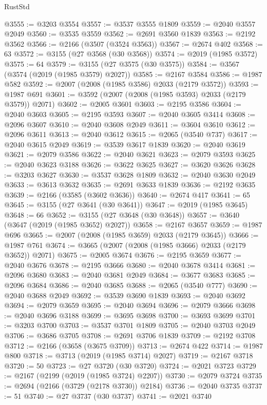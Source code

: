 \begin{lexlean}{RustStd}
\begin{coremodule}
@3555 := @3203 @3554
@3557 := @3537 @3555 @1809
@3559 := @2040 @3557 @2049
@3560 := @3535 @3559
@3562 := @2691 @3560 @1839
@3563 := @2192 @3562
@3566 := @2166 (@3507 (@3524 @3563))
@3567 := @2674 @402
@3568 := 63
@3572 := @3155 (@27 @3568 (@30 @3568))
@3574 := @2019 (@1985 @3572)
@3575 := 64
@3579 := @3155 (@27 @3575 (@30 @3575))
@3584 := @3567 (@3574 (@2019 (@1985 @3579) @2027))
@3585 := @2167 @3584
@3586 := @1987 @582
@3592 := @2007 (@2008 (@1985 @3586) @2033 (@2179 @3572))
@3593 := @1987 @691
@3601 := @3592 (@2007 (@2008 (@1985 @3593) @2033 (@2179 @3579)) @2071)
@3602 := @2005 @3601
@3603 := @2195 @3586
@3604 := @2040 @3603
@3605 := @2195 @3593
@3607 := @2040 @3605 @3414
@3608 := @2096 @3607
@3610 := @2040 @3608 @2049
@3611 := @3604 @3610
@3612 := @2096 @3611
@3613 := @2040 @3612
@3615 := @2065 (@3540 @737)
@3617 := @2040 @3615 @2049
@3619 := @3539 @3617 @1839
@3620 := @2040 @3619
@3621 := @2079 @3586
@3622 := @2040 @3621
@3623 := @2079 @3593
@3625 := @2040 @3623 @3188
@3626 := @3622 @3625
@3627 := @3620 @3626
@3628 := @3203 @3627
@3630 := @3537 @3628 @1809
@3632 := @2040 @3630 @2049
@3633 := @3613 @3632
@3635 := @2691 @3633 @1839
@3636 := @2192 @3635
@3639 := @2166 (@3585 (@3602 @3636))
@3640 := @2674 @417
@3641 := 65
@3645 := @3155 (@27 @3641 (@30 @3641))
@3647 := @2019 (@1985 @3645)
@3648 := 66
@3652 := @3155 (@27 @3648 (@30 @3648))
@3657 := @3640 (@3647 (@2019 (@1985 @3652) @2027))
@3658 := @2167 @3657
@3659 := @1987 @696
@3665 := @2007 (@2008 (@1985 @3659) @2033 (@2179 @3645))
@3666 := @1987 @761
@3674 := @3665 (@2007 (@2008 (@1985 @3666) @2033 (@2179 @3652)) @2071)
@3675 := @2005 @3674
@3676 := @2195 @3659
@3677 := @2040 @3676
@3678 := @2195 @3666
@3680 := @2040 @3678 @3414
@3681 := @2096 @3680
@3683 := @2040 @3681 @2049
@3684 := @3677 @3683
@3685 := @2096 @3684
@3686 := @2040 @3685
@3688 := @2065 (@3540 @777)
@3690 := @2040 @3688 @2049
@3692 := @3539 @3690 @1839
@3693 := @2040 @3692
@3694 := @2079 @3659
@3695 := @2040 @3694
@3696 := @2079 @3666
@3698 := @2040 @3696 @3188
@3699 := @3695 @3698
@3700 := @3693 @3699
@3701 := @3203 @3700
@3703 := @3537 @3701 @1809
@3705 := @2040 @3703 @2049
@3706 := @3686 @3705
@3708 := @2691 @3706 @1839
@3709 := @2192 @3708
@3712 := @2166 (@3658 (@3675 @3709))
@3713 := @2674 @422
@3714 := @1987 @800
@3718 := @3713 (@2019 (@1985 @3714) @2027)
@3719 := @2167 @3718
@3720 := 50
@3723 := @27 @3720 (@30 @3720)
@3724 := @2021 @3723
@3729 := @2167 (@2199 (@2019 (@1985 @3724) @2207))
@3730 := @2079 @3724
@3735 := @2694 (@2166 (@3729 (@2178 @3730)) @2184)
@3736 := @2040 @3735
@3737 := 51
@3740 := @27 @3737 (@30 @3737)
@3741 := @2021 @3740

\end{coremodule}
\end{lexlean}
